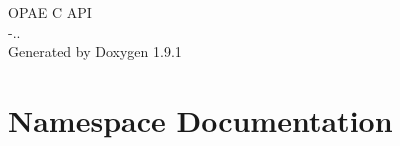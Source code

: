 \let\mypdfximage\pdfximage\def\pdfximage{\immediate\mypdfximage}\documentclass[twoside]{book}
\newcommand{\+}{\discretionary{\mbox{\scriptsize$\hookleftarrow$}}{}{}}
\newcommand{\clearemptydoublepage}{%
  \newpage{\pagestyle{empty}\cleardoublepage}%
}
\begin{document}
\raggedbottom

\begin{titlepage}
\vspace*{7cm}
\begin{center}%
{\Large OPAE C API \\[1ex]\large -\/.. }\\
\vspace*{1cm}
{\large Generated by Doxygen 1.9.1}\\
\end{center}
\end{titlepage}
\clearemptydoublepage
{}
\tableofcontents
\clearemptydoublepage
{}

\chapter{Namespace Documentation}










\end{document}
